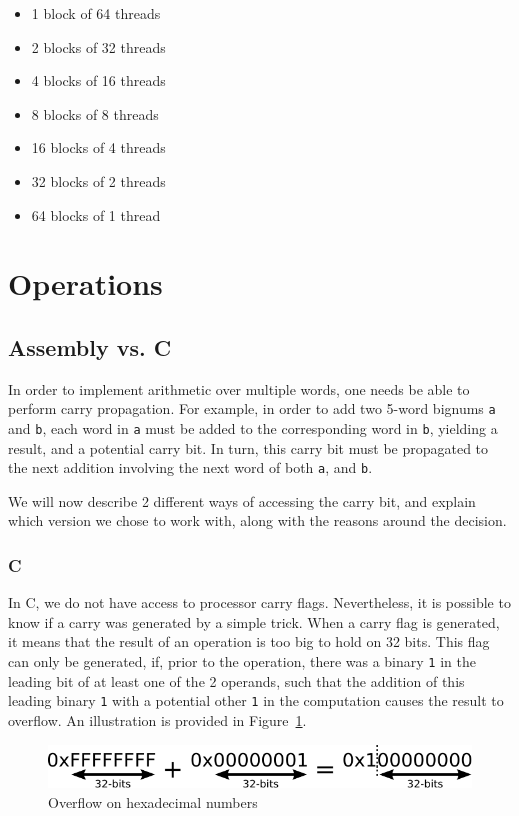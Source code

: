 \documentclass[10pt, a4paper]{report}
\begin{document}
\begin{itemize}
\item 1 block of 64 threads
\item 2 blocks of 32 threads
\item 4 blocks of 16 threads
\item 8 blocks of 8 threads
\item 16 blocks of 4 threads
\item 32 blocks of 2 threads
\item 64 blocks of 1 thread
\end{itemize}

\section{Operations}
\subsection{Assembly vs. C}
In order to implement arithmetic over multiple words, one needs be able to
perform carry propagation.
For example, in order to add two 5-word bignums \verb+a+ and \verb+b+, each word
in \verb+a+ must be added to the corresponding word in \verb+b+, yielding a
result, and a potential carry bit.
In turn, this carry bit must be propagated to the next addition involving the
next word of both \verb+a+, and \verb+b+.

We will now describe 2 different ways of accessing the carry bit, and explain
which version we chose to work with, along with the reasons around the decision.

\subsubsection{C}
In C, we do not have access to processor carry flags.
Nevertheless, it is possible to know if a carry was generated by a simple trick.
When a carry flag is generated, it means that the result of an operation is too
big to hold on 32 bits.
This flag can only be generated, if, prior to the operation, there was a binary
\verb+1+ in the leading bit of at least one of the 2 operands, such that the
addition of this leading binary \verb+1+ with a potential other \verb+1+ in the
computation causes the result to overflow.
An illustration is provided in Figure~\ref{fig:addition_overflow_illustration}.

\begin{figure}[h]
\centering
\includegraphics[scale=0.7]{figs/addition_overflow_illustration}
\caption{Overflow on hexadecimal numbers}
\label{fig:addition_overflow_illustration}
\end{figure}
\end{document}
